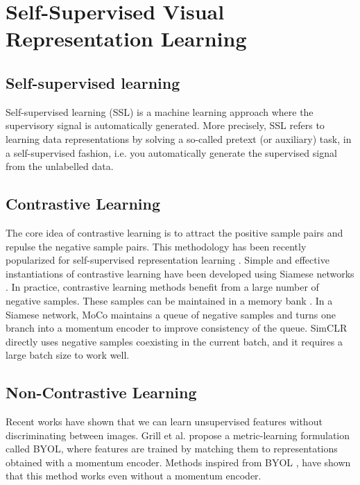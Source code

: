 \documentclass[12pt, letterpaper,cleardoubleempty,BCOR1cm]{scrbook}
\begin{document}
\section{Self-Supervised Visual Representation Learning \label{org4fa78d9}}
\label{sec:orgff19362}

\subsection{Self-supervised learning}
\label{sec:orgd727328}
Self-supervised learning (SSL) is a machine learning approach where the
supervisory signal is automatically generated. More precisely, SSL refers to
learning data representations by solving a so-called pretext (or auxiliary)
task, in a self-supervised fashion, i.e. you automatically generate the
supervised signal from the unlabelled data.

\subsection{Contrastive Learning}
\label{sec:orge56af60}
The core idea of contrastive learning is to attract the positive sample pairs
and repulse the negative sample pairs. This methodology has been recently
popularized for self-supervised representation learning \cite{Wu2018}. Simple
and effective instantiations of contrastive learning have been developed using
Siamese networks \cite{He2019,Chen2020a,Zbontar2021}. In practice,
contrastive learning methods benefit from a large number of negative
samples. These samples can be maintained in a memory bank \cite{Wu2018}. In a
Siamese network, MoCo \cite{He2019} maintains a queue of negative samples and
turns one branch into a momentum encoder to improve consistency of the
queue. SimCLR \cite{Chen2020a} directly uses negative samples coexisting in the
current batch, and it requires a large batch size to work well.

\subsection{Non-Contrastive Learning}
\label{sec:orgfd6e37a}
Recent works have shown that we can learn unsupervised features without
discriminating between images. Grill et al. \cite{Grill2020} propose a
metric-learning formulation called BYOL, where features are trained by matching
them to representations obtained with a momentum encoder. Methods inspired from
BYOL \cite{Chen2020,Caron2021}, have shown that this method works even without a
momentum encoder.
\end{document}
